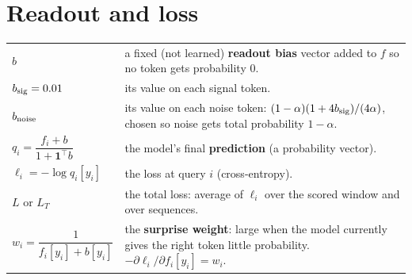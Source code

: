 \documentclass[11pt]{article}
\newcommand{\1}{\mathbf{1}}
\begin{document}
\section{Readout and loss}
\begin{center}
\begin{tabular}{>{\raggedright}p{2.6cm}p{11.8cm}}
\toprule
$b$ & a fixed (not learned) \textbf{readout bias} vector added to $f$ so no token gets probability 0.\\
$b_{\rm sig}=0.01$ & its value on each signal token.\\
$b_{\rm noise}$ & its value on each noise token: $(1-\alpha)(1+4b_{\rm sig})/(4\alpha)$, chosen so noise gets total probability $1-\alpha$.\\
$q_i=\dfrac{f_i+b}{1+\1^\top b}$ & the model's final \textbf{prediction} (a probability vector).\\
$\ell_i=-\log q_i[y_i]$ & the loss at query $i$ (cross-entropy).\\
$L$ or $L_T$ & the total loss: average of $\ell_i$ over the scored window and over sequences.\\
$w_i=\dfrac1{f_i[y_i]+b[y_i]}$ & the \textbf{surprise weight}: large when the model currently gives the right token little probability. $-\partial\ell_i/\partial f_i[y_i]=w_i$.\\
\bottomrule
\end{tabular}
\end{center}
\end{document}
